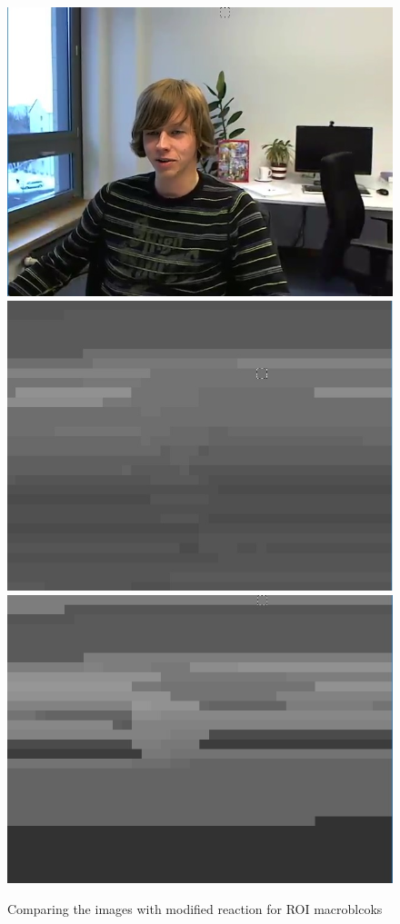 \documentclass[11pt]{article} %
\begin{document}
\begin{figure}[!h]
	\includegraphics[scale=0.4]{BufferControl/paul120_250kbps_bufferControl}
	\includegraphics[scale=0.37]{PaulDefault120_91250kbps_quant}
	\includegraphics[scale=0.4]{BufferControl/paul120_250kbps_BufferControl_quant}    
	\caption{Comparing the images with modified reaction for ROI macroblcoks}
	\label{fig:Default_BufferControlCompare}
\end{figure}
\end{document}
